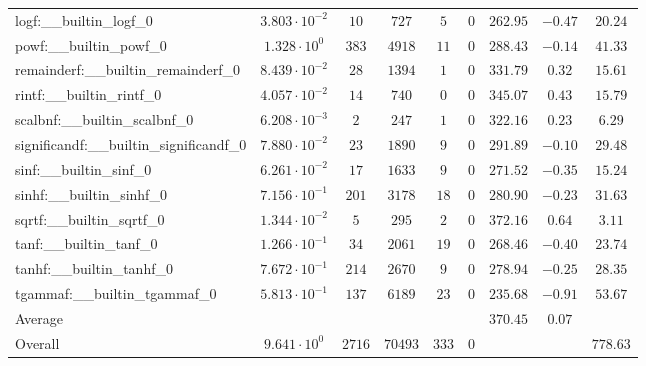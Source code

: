 \begin{tabular}{|l|c|c|c|c|c|c|c|c|}
logf:\_\_builtin\_logf\_0                 & $ 3.803 \cdot 10^{-2} $ & $ 10     $ & $ 727   $ & $ 5   $ & $ 0   $ & $ 262.95      $ & $ -0.47   $ & $ 20.24   $ \\
powf:\_\_builtin\_powf\_0                 & $ 1.328 \cdot 10^{0}  $ & $ 383    $ & $ 4918  $ & $ 11  $ & $ 0   $ & $ 288.43      $ & $ -0.14   $ & $ 41.33   $ \\
remainderf:\_\_builtin\_remainderf\_0     & $ 8.439 \cdot 10^{-2} $ & $ 28     $ & $ 1394  $ & $ 1   $ & $ 0   $ & $ 331.79      $ & $ 0.32    $ & $ 15.61   $ \\
rintf:\_\_builtin\_rintf\_0               & $ 4.057 \cdot 10^{-2} $ & $ 14     $ & $ 740   $ & $ 0   $ & $ 0   $ & $ 345.07      $ & $ 0.43    $ & $ 15.79   $ \\
scalbnf:\_\_builtin\_scalbnf\_0           & $ 6.208 \cdot 10^{-3} $ & $ 2      $ & $ 247   $ & $ 1   $ & $ 0   $ & $ 322.16      $ & $ 0.23    $ & $ 6.29    $ \\
significandf:\_\_builtin\_significandf\_0 & $ 7.880 \cdot 10^{-2} $ & $ 23     $ & $ 1890  $ & $ 9   $ & $ 0   $ & $ 291.89      $ & $ -0.10   $ & $ 29.48   $ \\
sinf:\_\_builtin\_sinf\_0                 & $ 6.261 \cdot 10^{-2} $ & $ 17     $ & $ 1633  $ & $ 9   $ & $ 0   $ & $ 271.52      $ & $ -0.35   $ & $ 15.24   $ \\
sinhf:\_\_builtin\_sinhf\_0               & $ 7.156 \cdot 10^{-1} $ & $ 201    $ & $ 3178  $ & $ 18  $ & $ 0   $ & $ 280.90      $ & $ -0.23   $ & $ 31.63   $ \\
sqrtf:\_\_builtin\_sqrtf\_0               & $ 1.344 \cdot 10^{-2} $ & $ 5      $ & $ 295   $ & $ 2   $ & $ 0   $ & $ 372.16      $ & $ 0.64    $ & $ 3.11    $ \\
tanf:\_\_builtin\_tanf\_0                 & $ 1.266 \cdot 10^{-1} $ & $ 34     $ & $ 2061  $ & $ 19  $ & $ 0   $ & $ 268.46      $ & $ -0.40   $ & $ 23.74   $ \\
tanhf:\_\_builtin\_tanhf\_0               & $ 7.672 \cdot 10^{-1} $ & $ 214    $ & $ 2670  $ & $ 9   $ & $ 0   $ & $ 278.94      $ & $ -0.25   $ & $ 28.35   $ \\
tgammaf:\_\_builtin\_tgammaf\_0           & $ 5.813 \cdot 10^{-1} $ & $ 137    $ & $ 6189  $ & $ 23  $ & $ 0   $ & $ 235.68      $ & $ -0.91   $ & $ 53.67   $ \\
\hline
Average                                   & $                     $ & $        $ & $       $ & $     $ & $     $ & $ 370.45      $ & $ 0.07    $ & $         $ \\
\hline
Overall                                   & $ 9.641 \cdot 10^{0}  $ & $ 2716   $ & $ 70493 $ & $ 333 $ & $ 0   $ & $             $ & $         $ & $ 778.63  $ \\
\hline
\end{tabular}
